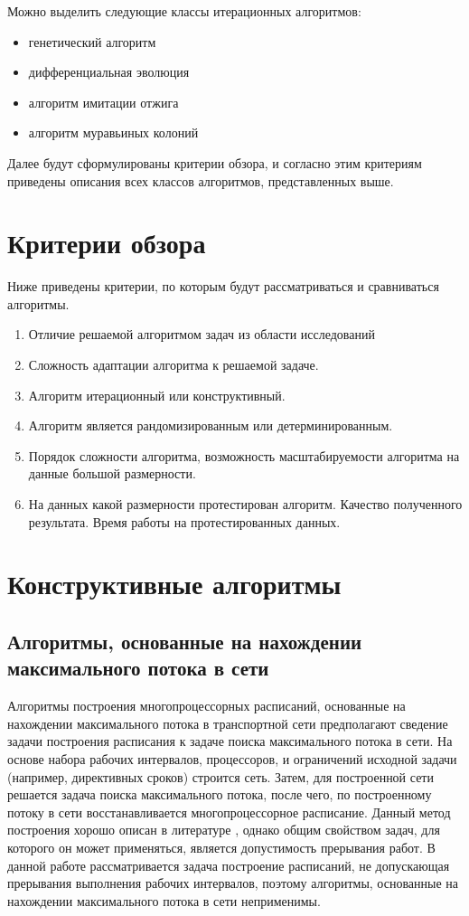 \documentclass{article}
\begin{document}
  Можно выделить следующие классы итерационных алгоритмов:
  \begin{itemize}
    \item генетический алгоритм
    \item дифференциальная эволюция
    \item алгоритм имитации отжига
    \item алгоритм муравьиных колоний
  \end{itemize}
  Далее будут сформулированы критерии обзора, и согласно этим критериям приведены описания всех классов алгоритмов, представленных выше.
  \newpage

  \section{Критерии обзора}

  Ниже приведены критерии, по которым будут рассматриваться и сравниваться алгоритмы.
  \begin{enumerate}
    \item Отличие решаемой алгоритмом задач из области исследований
    \item Сложность адаптации алгоритма к решаемой задаче.
    \item Алгоритм итерационный или конструктивный.
    \item Алгоритм является рандомизированным или детерминированным.
    \item Порядок сложности алгоритма, возможность масштабируемости алгоритма на данные большой размерности.
    \item На данных какой размерности протестирован алгоритм. Качество полученного результата. Время работы на протестированных данных.
  \end{enumerate}
  \newpage


  \section{Конструктивные алгоритмы}
  \subsection{Алгоритмы, основанные на нахождении максимального потока в сети}
  Алгоритмы построения многопроцессорных расписаний, основанные на нахождении максимального потока в транспортной сети \cite{MaxFlowProblem} предполагают сведение задачи построения расписания к задаче поиска максимального потока в сети. На основе набора рабочих интервалов, процессоров, и ограничений исходной задачи (например, директивных сроков) строится сеть. Затем, для построенной сети решается задача поиска максимального потока, после чего, по построенному потоку в сети восстанавливается многопроцессорное расписание. Данный метод построения хорошо описан в литературе \cite{Stone_1977}, однако общим свойством задач, для которого он может применяться, является допустимость прерывания работ. В данной работе рассматривается задача построение расписаний, не допускающая прерывания выполнения рабочих интервалов, поэтому алгоритмы, основанные на нахождении максимального потока в сети неприменимы.
\end{document}

